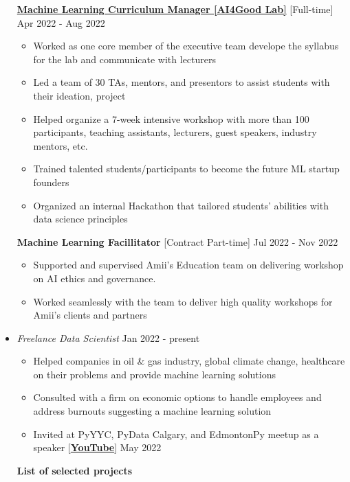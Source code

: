 \documentclass[10pt,a4paper,sans]{moderncv} %
\begin{document}
\begin{itemize}
		\href{http://ai4goodlab.com/}{%
			\textbf{Machine Learning Curriculum Manager [AI4Good Lab]}}  [Full-time] \hfill Apr 2022 - Aug 2022
		
		\begin{itemize}
			\item Worked as one core member of the executive team develope the syllabus for the lab and communicate with lecturers
			\item Led a team of 30 TAs, mentors, and presentors to assist students with their ideation, project
			\item Helped organize a 7-week intensive workshop with more than 100 participants, teaching assistants, lecturers, guest speakers, industry mentors, etc.
			\item Trained talented students/participants to become the future ML startup founders
			\item Organized an internal Hackathon that tailored students' abilities with data science principles
		\end{itemize}
		
        \textbf{Machine Learning Facillitator} [Contract Part-time] \hfill Jul 2022 - Nov 2022
        \begin{itemize}
			\item Supported and supervised Amii's Education team on delivering workshop on AI ethics and governance.

			   \item Worked seamlessly with the team to deliver high quality workshops for Amii's clients and partners

		\end{itemize}
		
\vspace{0.5cm}
	\item \href{https://hadi2525.github.io}{} \emph{\large Freelance Data Scientist} \hfill Jan 2022 - present
	\vspace{0.25cm}
	
	\begin{itemize}
		\item Helped companies in oil \& gas industry, global climate change, healthcare on their problems and provide machine learning solutions
		\item Consulted with a firm on economic options to handle employees and address burnouts suggesting a machine learning solution
		\item Invited at PyYYC, PyData Calgary, and EdmontonPy meetup as a speaker [\href{https://www.youtube.com/watch?v=4S_QGDHTICw}{\textbf{YouTube}]} \hfill May 2022
	\end{itemize}
	\textbf{List of selected projects}
	\begin{itemize}
		

\end{itemize}
\end{itemize}
\end{document}
